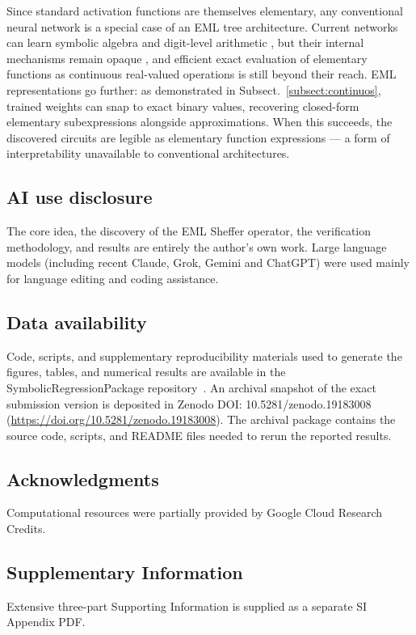 \documentclass[12pt]{article}
\begin{document}
Since standard activation functions are themselves elementary, any conventional neural network is a special case of an EML tree architecture. Current networks can learn symbolic algebra \cite{lample2020deep} and digit-level arithmetic \cite{lee2024teaching}, but their internal mechanisms remain opaque \cite{liu2025kan}, and efficient exact evaluation of elementary functions as continuous real-valued operations is still beyond their reach. EML representations go further: as demonstrated in Subsect.~\ref{subsect:continuos}, trained weights can snap to exact binary values, recovering closed-form elementary subexpressions alongside approximations. When this succeeds, the discovered circuits are legible as elementary function expressions --- a form of interpretability unavailable to conventional architectures.




\subsection*{AI use disclosure}
The core idea, the discovery of the EML Sheffer operator, the verification methodology, and results are entirely the author's own work.
Large language models (including recent Claude, Grok, Gemini and ChatGPT) were used mainly for language editing and coding assistance. 

\subsection*{Data availability}
Code, scripts, and supplementary reproducibility materials used to generate the figures, tables, and numerical results are available in the SymbolicRegressionPackage repository~\cite{SymbolicRegressionPackage}. An archival snapshot of the exact submission version is deposited in Zenodo DOI: 10.5281/zenodo.19183008 (\url{https://doi.org/10.5281/zenodo.19183008}). The archival package contains the source code, scripts, and README files needed to rerun the reported results.


\subsection*{Acknowledgments}
Computational resources were partially provided by Google Cloud Research Credits.


\subsection*{Supplementary Information}

Extensive three-part Supporting Information is supplied as a separate SI Appendix PDF. 



\end{document}
